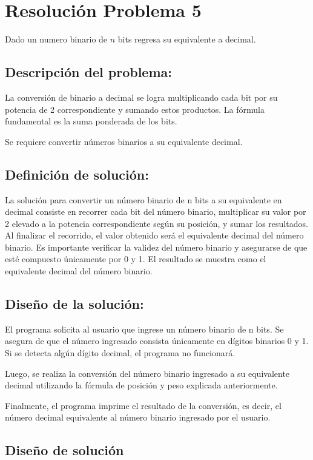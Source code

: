 \section{Resolución Problema 5}
Dado un numero binario de $n$ bits regresa su equivalente a decimal.


\subsection{\textbf{Descripción del problema:}}

La conversión de binario a decimal se logra multiplicando cada bit por su potencia de 2 correspondiente y sumando estos productos. La fórmula fundamental es la suma ponderada de los bits.


Se requiere convertir números binarios a su equivalente decimal.

\subsection{\textbf{Definición de solución:}}
La solución para convertir un número binario de n bits a su equivalente en decimal consiste en recorrer cada bit del número binario, multiplicar su valor por 2 elevado a la potencia correspondiente según su posición, y sumar los resultados. Al finalizar el recorrido, el valor obtenido será el equivalente decimal del número binario. Es importante verificar la validez del número binario y asegurarse de que esté compuesto únicamente por 0 y 1. El resultado se muestra como el equivalente decimal del número binario.


\subsection{\textbf{Diseño de la solución:}}
El programa solicita al usuario que ingrese un número binario de n bits. Se asegura de que el número ingresado consista únicamente en dígitos binarios 0 y 1. Si se detecta algún dígito decimal, el programa no funcionará.

Luego, se realiza la conversión del número binario ingresado a su equivalente decimal utilizando la fórmula de posición y peso explicada anteriormente.

Finalmente, el programa imprime el resultado de la conversión, es decir, el número decimal equivalente al número binario ingresado por el usuario.

\subsection{\textbf{Diseño de solución}}

